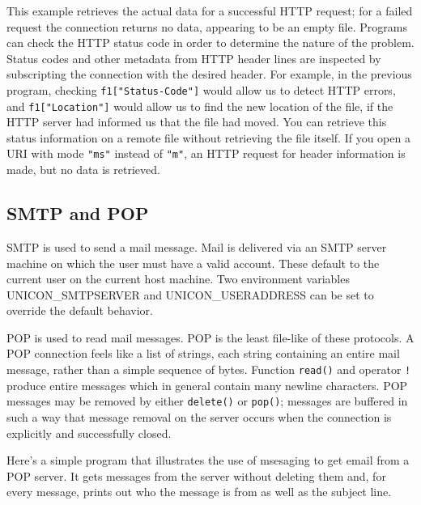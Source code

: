 This example retrieves the actual data for a successful HTTP request;
for a failed request the connection returns no data, appearing to be an
empty file. Programs can check the HTTP status code in order to
determine the nature of the problem. Status codes and other metadata
from HTTP header lines are inspected by subscripting the connection
with the desired header. For example, in the previous program, checking
\texttt{f1["Status-Code"]} would allow us
to detect HTTP errors, and
\texttt{f1["Location"]} would allow us to
find the new location of the file, if the HTTP server had informed us
that the file had moved. You can retrieve this status information on a
remote file without retrieving the file itself. If you open a URI with
mode \texttt{"ms"} instead of
\texttt{"m"}, an HTTP request for header
information is made, but no data is retrieved.

\subsection{SMTP and POP}

SMTP is used to send a mail message. Mail is delivered via
an SMTP server machine on which the user must have a valid account.
These default to the current user on the current host machine. Two
environment variables UNICON\_SMTPSERVER and UNICON\_USERADDRESS can be
set to override the default behavior.

POP is used to read mail messages. POP is the least file-like
of these protocols. A POP connection feels like a list of strings, each
string containing an entire mail message, rather than a simple sequence
of bytes. Function \texttt{read()} and operator \texttt{!} produce
entire messages which in general contain many newline characters. POP
messages may be removed by either \texttt{delete()} or \texttt{pop()};
messages are buffered in such a way that message removal on the server
occurs when the connection is explicitly and successfully closed.

Here's a simple program that illustrates the use of
msesaging to get email from a POP server. It gets messages from the
server without deleting them and, for every message, prints out who the
message is from as well as the subject line.

